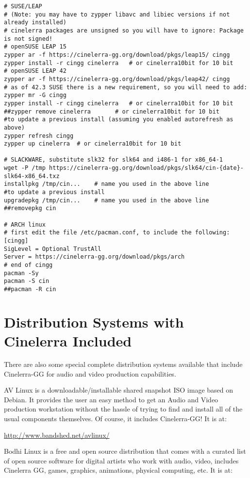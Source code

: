 \begin{lstlisting}
# SUSE/LEAP
# (Note: you may have to zypper libavc and libiec versions if not already installed)
# cinelerra packages are unsigned so you will have to ignore: Package is not signed!
# openSUSE LEAP 15
zypper ar -f https://cinelerra-gg.org/download/pkgs/leap15/ cingg
zypper install -r cingg cinelerra   # or cinelerra10bit for 10 bit
# openSUSE LEAP 42
zypper ar -f https://cinelerra-gg.org/download/pkgs/leap42/ cingg
# as of 42.3 SUSE there is a new requirement, so you will need to add:
zypper mr -G cingg
zypper install -r cingg cinelerra   # or cinelerra10bit for 10 bit
##zypper remove cinelerra	    # or cinelerra10bit for 10 bit
#to update a previous install (assuming you enabled autorefresh as above)
zypper refresh cingg
zypper up cinelerra  # or cinelerra10bit for 10 bit

# SLACKWARE, substitute slk32 for slk64 and i486-1 for x86_64-1
wget -P /tmp https://cinelerra-gg.org/download/pkgs/slk64/cin-{date}-slk64-x86_64.txz
installpkg /tmp/cin...    # name you used in the above line
#to update a previous install
upgradepkg /tmp/cin...    # name you used in the above line
##removepkg cin

# ARCH linux
# first edit the file /etc/pacman.conf, to include the following:
[cingg]
SigLevel = Optional TrustAll
Server = https://cinelerra-gg.org/download/pkgs/arch
# end of cingg
pacman -Sy
pacman -S cin
##pacman -R cin
\end{lstlisting}

\section{Distribution Systems with Cinelerra Included}%
\label{sec:distribution_systems_with_cinelerra_included}

There are also some special complete distribution systems available that include Cinelerra-GG for audio and video production capabilities.

AV Linux is a downloadable/installable shared snapshot ISO image based on Debian. 
It provides the user an easy method to get an Audio and Video production workstation without the hassle of trying to find and install all of the usual components themselves. 
Of course, it includes Cinelerra-GG!  
It is at:

\url{http://www.bandshed.net/avlinux/}

Bodhi Linux is a free and open source distribution that comes with a curated list of open source software for digital artists who work with audio, video, includes Cinelerra GG, games, graphics, animations, physical computing, etc.  
It is at:

